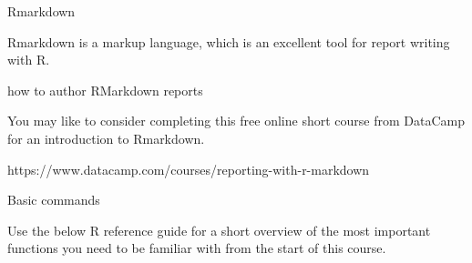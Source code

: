 \documentclass[11pt]{article}
\begin{document}
Rmarkdown

Rmarkdown is a markup language, which is an excellent tool for report writing
with R.

how to author RMarkdown reports

You may like to consider completing this free online short course from DataCamp
for an introduction to Rmarkdown.

https://www.datacamp.com/courses/reporting-with-r-markdown

Basic commands

Use the below R reference guide for a short overview of the most important
functions you need to be familiar with from the start of this course.
\end{document}
